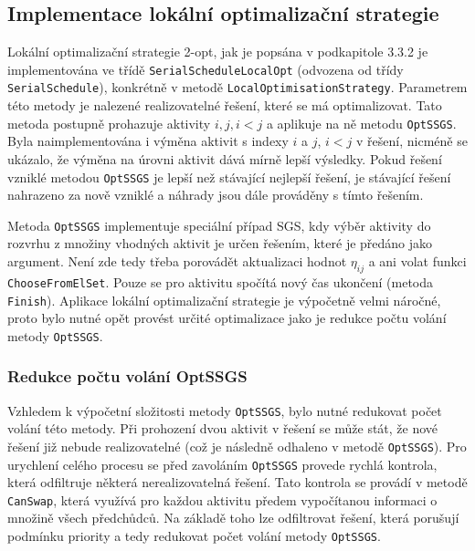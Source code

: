 \documentclass[a4paper,12pt]{article}
\begin{document}
\subsection{Implementace lokální optimalizační strategie}

Lokální optimalizační strategie 2-opt, jak je popsána v podkapitole 3.3.2 je implementována
ve třídě \texttt{SerialScheduleLocalOpt} (odvozena od třídy \texttt{SerialSchedule}), konkrétně v metodě \texttt{LocalOptimisationStrategy}.
Parametrem této metody je nalezené realizovatelné řešení, které se má optimalizovat. Tato
metoda postupně prohazuje aktivity $i,j,i<j$ a aplikuje na ně metodu 
\texttt{OptSSGS}. Byla naimplementována i výměna aktivit s indexy $i$ a $j$, $i<j$ v řešení, nicméně se ukázalo, že výměna na 
úrovni aktivit dává mírně lepší výsledky. Pokud řešení vzniklé metodou \texttt{OptSSGS} je lepší než stávající
nejlepší řešení, je stávající řešení nahrazeno za nově vzniklé a náhrady jsou dále prováděny
s tímto řešením.

Metoda \texttt{OptSSGS} implementuje speciální případ SGS, kdy výběr aktivity do rozvrhu
z množiny vhodných aktivit je určen řešením, které je předáno jako argument. Není
zde tedy třeba porovádět aktualizaci hodnot $\eta_{ij}$ a ani volat funkci 
\texttt{ChooseFromElSet}. Pouze se pro aktivitu spočítá nový čas ukončení (metoda \texttt{Finish}).
Aplikace lokální optimalizační strategie je výpočetně velmi náročné, proto bylo
nutné opět provést určité optimalizace jako je redukce počtu volání metody \texttt{OptSSGS}.

\subsubsection{Redukce počtu volání OptSSGS}
Vzhledem k výpočetní složitosti metody \texttt{OptSSGS}, bylo nutné redukovat počet volání této metody.
Při prohození dvou aktivit v řešení se může stát, že nové řešení již nebude realizovatelné (což je 
následně odhaleno v metodě \texttt{OptSSGS}). Pro urychlení celého procesu se před zavoláním \texttt{OptSSGS}
provede rychlá kontrola, která odfiltruje některá nerealizovatelná řešení. Tato kontrola se provádí
v metodě \texttt{CanSwap}, která využívá pro každou aktivitu předem vypočítanou informaci o množině 
všech předchůdců. Na základě toho lze odfiltrovat řešení, která porušují podmínku priority a tedy
redukovat počet volání metody \texttt{OptSSGS}.
\end{document}
